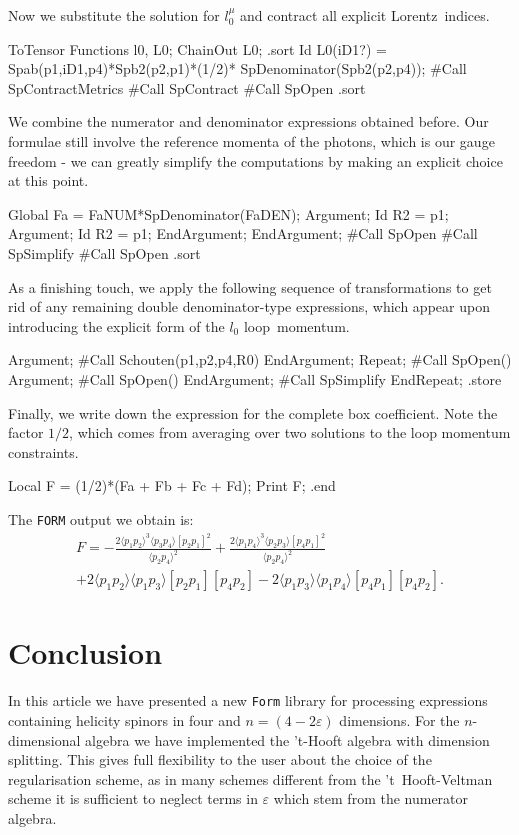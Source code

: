 \documentclass[preprint,number,12pt,sort&compress]{elsarticle}
\newcommand{\FORM}{{\texttt{Form}}}
\newcommand{\Spaa}[1]{\langle #1 \rangle}
\newcommand{\Spbb}[1]{[ #1 ]}
\begin{document}
Now we substitute the solution for $l_0^{\mu}$ and contract all explicit
Lorentz~indices.
\begin{spform}
ToTensor Functions l0, L0;
ChainOut L0;
.sort
Id L0(iD1?) = Spab(p1,iD1,p4)*Spb2(p2,p1)*(1/2)*
              SpDenominator(Spb2(p2,p4));
#Call SpContractMetrics
#Call SpContract
#Call SpOpen
.sort
\end{spform}
We combine the numerator and denominator expressions obtained before.
Our formulae still involve the reference momenta of the photons,
which is our gauge freedom - we can greatly simplify the computations
by making an explicit choice at this point.
\begin{spform}
Global Fa = FaNUM*SpDenominator(FaDEN);
Argument;
   Id R2 = p1;
   Argument;
      Id R2 = p1;
   EndArgument;
EndArgument;
#Call SpOpen
#Call SpSimplify
#Call SpOpen
.sort
\end{spform}
As a finishing touch, we apply the following sequence of transformations
to get rid of any remaining double denominator-type expressions,
which appear upon introducing the explicit form of the $l_0$ loop~momentum.
\begin{spform}
Argument;
   #Call Schouten(p1,p2,p4,R0)
EndArgument;
Repeat;
   #Call SpOpen()
   Argument;
      #Call SpOpen()
   EndArgument;
   #Call SpSimplify
EndRepeat;
.store
\end{spform}

Finally, we write down the expression for the complete box coefficient.
Note the factor $1/2$, which comes from averaging over two solutions to the
loop momentum constraints.
\begin{spform}
Local F = (1/2)*(Fa + Fb + Fc + Fd);
Print F;
.end
\end{spform}

The \texttt{FORM} output we obtain is:
\begin{multline}\label{eq:UN3}     
F = -\frac{2\Spaa{p_1  p_2}^3\Spaa{p_3  p_4}\Spbb{p_2  p_1}^2}{
    \Spaa{p_2  p_4}^2} + \frac{2\Spaa{p_1  p_4}^3\Spaa{p_2  p_3}
    \Spbb{p_4  p_1}^2}{\Spaa{p_2  p_4}^2} \\
   +2\Spaa{p_1  p_2}\Spaa{p_1  p_3}\Spbb{p_2  p_1}\Spbb{p_4  p_2} - 
 2\Spaa{p_1  p_3}\Spaa{p_1  p_4}\Spbb{p_4  p_1}\Spbb{p_4  p_2}.
\end{multline}

\section{Conclusion}\label{sec:conclusion}
In this article we have presented a new \FORM{} library for processing
expressions containing helicity spinors in four and
$n=(4-2\varepsilon)$ dimensions.
For the $n$-dimensional algebra we have implemented the 't-Hooft algebra
with dimension splitting.
This gives full flexibility to the user about the choice of the
regularisation scheme, as in many schemes different from
the 't~Hooft-Veltman scheme it is sufficient to neglect terms
in $\varepsilon$ which stem from the numerator algebra.
\end{document}
